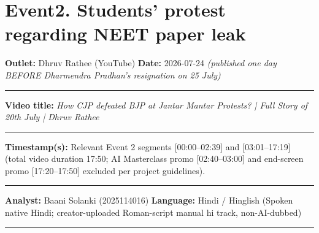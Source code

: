 \documentclass[10pt,a4paper]{article}
\newcommand{\formrule}{\par\vspace{3pt}\noindent\rule{\textwidth}{0.35pt}\par\vspace{7pt}}
\newcommand{\sectionrule}{\par\vspace{4pt}\noindent\rule{\textwidth}{0.4pt}\par\vspace{8pt}}
\begin{document}
\newpage
\section*{Event2. Students' protest regarding NEET paper leak}
\par\vspace{6pt}
{\small
\noindent\textbf{Outlet:} Dhruv Rathee (YouTube) \hfill \textbf{Date:} 2026-07-24 \emph{(published one day BEFORE Dharmendra Pradhan's resignation on 25 July)}
\formrule
\noindent\textbf{Video title:} \emph{How CJP defeated BJP at Jantar Mantar Protests? | Full Story of 20th July | Dhruv Rathee}
\formrule
\noindent\textbf{Timestamp(s):} Relevant Event 2 segments [00:00--02:39] and [03:01--17:19] (total video duration 17:50; AI Masterclass promo [02:40--03:00] and end-screen promo [17:20--17:50] excluded per project guidelines).
\formrule
\noindent\textbf{Analyst:} Baani Solanki (2025114016) \hfill \textbf{Language:} Hindi / Hinglish (Spoken native Hindi; creator-uploaded Roman-script manual hi track, non-AI-dubbed)
}
\sectionrule
\end{document}
